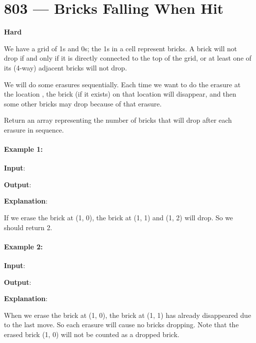 \section{803 --- Bricks Falling When Hit}

\textbf{Hard}

We have a grid of 1s and 0s; the 1s in a cell represent bricks.  A brick will not drop if and only if it is directly connected to the top of the grid, or at least one of its (4-way) adjacent bricks will not drop.

We will do some erasures sequentially. Each time we want to do the erasure at the location , the brick (if it exists) on that location will disappear, and then some other bricks may drop because of that erasure.

Return an array representing the number of bricks that will drop after each erasure in sequence.

\paragraph{Example 1:}
\begin{flushleft}

\textbf{Input}: 



\textbf{Output}: \fcj{[2]}

\textbf{Explanation}: 

If we erase the brick at (1, 0), the brick at (1, 1) and (1, 2) will drop. So we should return 2.

\end{flushleft}

\paragraph{Example 2:}

\begin{flushleft}
\textbf{Input}: 



\textbf{Output}: \fcj{[0,0]}

\textbf{Explanation}: 

When we erase the brick at (1, 0), the brick at (1, 1) has already disappeared due to the last move. So each erasure will cause no bricks dropping.  Note that the erased brick (1, 0) will not be counted as a dropped brick.
\end{flushleft}
 

